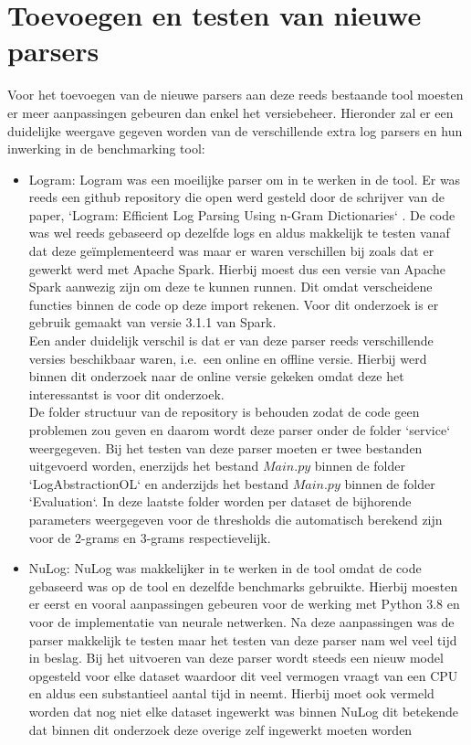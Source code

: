 \section{Toevoegen en testen van nieuwe parsers}
Voor het toevoegen van de nieuwe parsers aan deze reeds bestaande tool moesten er meer aanpassingen gebeuren dan enkel het versiebeheer. Hieronder zal er een duidelijke weergave gegeven worden van de verschillende extra log parsers en hun inwerking in de benchmarking tool:
\begin{itemize}
    \item Logram: Logram was een moeilijke parser om in te werken in de tool. Er was reeds een github repository die open werd gesteld door de schrijver van de paper, `Logram: Efficient Log Parsing Using n-Gram Dictionaries` \autocite{dai2020logram}. De code was wel reeds gebaseerd op dezelfde logs en aldus makkelijk te testen vanaf dat deze geïmplementeerd was maar er waren verschillen bij zoals dat er gewerkt werd met Apache Spark. Hierbij moest dus een versie van Apache Spark aanwezig zijn om deze te kunnen runnen. Dit omdat verscheidene functies binnen de code op deze import rekenen. Voor dit onderzoek is er gebruik gemaakt van versie 3.1.1 van Spark. \\
    
    Een ander duidelijk verschil is dat er van deze parser reeds verschillende versies beschikbaar waren, i.e.\ een online en offline versie. Hierbij werd binnen dit onderzoek naar de online versie gekeken omdat deze het interessantst is voor dit onderzoek.\\
    
    De folder structuur van de repository is behouden zodat de code geen problemen zou geven en daarom wordt deze parser onder de folder `service` weergegeven. Bij het testen van deze parser moeten er twee bestanden uitgevoerd worden, enerzijds het bestand $Main.py$ binnen de folder `LogAbstractionOL` en anderzijds het bestand $Main.py$ binnen de folder `Evaluation`. In deze laatste folder worden per dataset de bijhorende parameters weergegeven voor de thresholds die automatisch berekend zijn voor de 2-grams en 3-grams respectievelijk.\\
    
    \item NuLog: NuLog was makkelijker in te werken in de tool omdat de code gebaseerd was op de tool en dezelfde benchmarks gebruikte. Hierbij moesten er eerst en vooral aanpassingen gebeuren voor de werking met Python 3.8 en voor de implementatie van neurale netwerken. Na deze aanpassingen was de parser makkelijk te testen maar het testen van deze parser nam wel veel tijd in beslag. Bij het uitvoeren van deze parser wordt steeds een nieuw model opgesteld voor elke dataset waardoor dit veel vermogen vraagt van een CPU en aldus een substantieel aantal tijd in neemt. Hierbij moet ook vermeld worden dat nog niet elke dataset ingewerkt was binnen NuLog dit betekende dat binnen dit onderzoek deze overige zelf ingewerkt moeten worden
    

\end{itemize}
